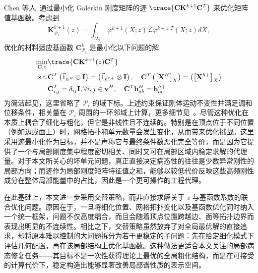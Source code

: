 Chen 等人~\cite{chen2019material, chen2018numerical}通过最小化 Galerkin 刚度矩阵的迹 $\trace{\mathbf{C} \mathbf{K}^{k+1} \mathbf{C}^T}$ 来优化矩阵值基函数。考虑到
\begin{equation}
  \mathbf{K}^{k+1}_{\mathcal{P}_i}(z) = \int_{\Omega_{\mathcal{P}_i}}\varphi^{k+1}(X;z) \mathcal{L} \varphi^{k+1, T}(X;z)  dX,
\end{equation}
优化的材料适应基函数 $\mathbf{C}^k_{\mathcal{P}_i}$ 是最小化以下问题的解
\begin{equation}
  \begin{split}
    \min_{\mathbf{C}, z} &\trace{\mathbf{C}  \mathbf{K}^{k+1} (z) \mathbf{C}^T}\\
    \text{s.t.}  &\mathbf{C}^T \left(\vec{1}_{n^H}  \otimes \mathbf{I} \right) = \left(\vec{1}_{n^{h+}} \otimes \mathbf{I} \right), \quad \mathbf{C}^T \left( \left[ \mathbf{X}^H \right]_X \right) =  \left( \left[ \mathbf{X}^{h+} \right]_X \right)\\
    &\mathbf{C}_{i,j}^T = \delta_{ij} \mathbf{I}, \forall i,j \in \mathbf{v}^H, \quad \mathbf{C}^T \mathbf{h}_{ab}^H = \mathbf{h}_{ab}^{h+}
  \end{split}
  \label{eq:opt_basis}
\end{equation}
为简洁起见，这里省略了 $\mathcal{P}_i$ 的域下标。上述约束保证刚体运动不变性并满足调和位移条件，相关量在 $\mathcal{P}_i$ 周围的一环邻域上计算，更多细节见~\cite{chen2018numerical, heFast2023}。尽管这种优化在本质上耦合了细化与粗化，但它是非线性且不连续的。特别是在顶点位于不同位置（例如边或面上）时，网格拓扑和单元数量会发生变化，从而带来优化挑战。这里采用迹最小化作为目标，并不是声称它与最终条件数恶化完全等价，而是因为它提供了一个与局部刚度集中程度密切相关、同时又可在局部区域内稳定求解的代理量。对于本文所关心的坏单元问题，真正直接决定病态性的往往是少数异常刚性的局部方向；而迹作为局部刚度矩阵特征值之和，能够以较低代价反映这些高频刚性成分在整体局部能量中的占比，因此是一个更可操作的工程代理。

在此基础上，本文进一步采用交替策略，而非直接求解关于 $z$ 与基函数系数的联合优化问题。原因在于，一旦将细化位置、网格拓扑变化以及基函数优化同时纳入一个统一框架，问题不仅高度耦合，而且会随着顶点位置跨越边、面等拓扑边界而表现出明显的不连续性。相比之下，交替策略虽然放弃了对全局最优解的直接追求，却将原本难以控制的大问题拆分为若干更稳定的子问题：先在给定细化模式下评估几何配置，再在该局部结构上优化基函数。这种做法更适合本文关注的局部病态修复任务——其目标不是一次性获得理论上最优的全局粗化结构，而是在可接受的计算代价下，稳定构造出能够显著改善局部谱性质的表示空间。

